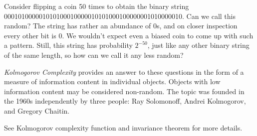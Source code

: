 \documentclass[12pt]{article}
\begin{document}

Consider flipping a coin 50 times to obtain the binary string
000101000001010100010000010101000100000001010000010.
Can we call this random? The string has rather an abundance of 0s,
and on closer inspection every other bit is 0. We wouldn't expect even
a biased coin to come up with such a pattern. Still, this string
has probability $2^{-50}$, just like any other binary string of the same length,
so how can we call it any less random?

{\em Kolmogorov Complexity} provides an answer to these questions in the form
of a measure of information content in individual objects. Objects with low
information content may be considered non-random.
The topic was founded in the 1960s independently by three people:
Ray Solomonoff, Andrei Kolmogorov, and Gregory Chaitin.

See Kolmogorov complexity function and invariance theorem for more details.
\end{document}
